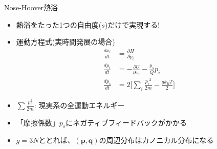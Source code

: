 \documentclass[dvipdfmx]{beamer}
\begin{document}
\begin{frame}[t,fragile]{Nose-Hoover熱浴}
  \begin{itemize}
  \item 熱浴をたった1つの自由度($s$)だけで実現する!
  \item 運動方程式(実時間発展の場合)
    \begin{align*}
      \frac{dx_i}{dt} &= \frac{\partial H}{\partial p_i} \\
      \frac{dp_i}{dt} &= -\frac{\partial U}{\partial x_i} -\frac{p_s}{Q} p_i \\
      \frac{dp_s}{dt} &= 2 \big[ \sum_i \frac{{p_i}^2}{2m} - \frac{g k_B T}{2} \big]
    \end{align*}
  \item $\sum \frac{p_i^2}{2m}$: 現実系の全運動エネルギー
  \item 「摩擦係数」$p_s$にネガティブフィードバックがかかる
  \item $g=3N$ととれば、$(\mathbf{p},\mathbf{q})$の周辺分布はカノニカル分布になる
  \end{itemize}
\end{frame}
\end{document}
